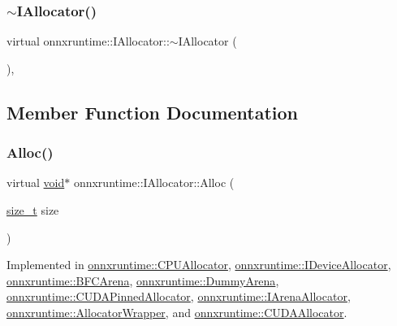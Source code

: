 \subsubsection{\texorpdfstring{$\sim$\+I\+Allocator()}{~IAllocator()}}
{\footnotesize\ttfamily virtual onnxruntime\+::\+I\+Allocator\+::$\sim$\+I\+Allocator (\begin{DoxyParamCaption}{ }\end{DoxyParamCaption})\hspace{0.3cm}{\ttfamily [virtual]}, {\ttfamily [default]}}



\subsection{Member Function Documentation}
\mbox{\label{classonnxruntime_1_1IAllocator_a765590df724d3e7805c1dddbfe290b11}} 
\subsubsection{\texorpdfstring{Alloc()}{Alloc()}}
{\footnotesize\ttfamily virtual \mbox{\hyperlink{mlasi_8h_a88f941d423cb2a819b70a1358982b1a6}{void}}$\ast$ onnxruntime\+::\+I\+Allocator\+::\+Alloc (\begin{DoxyParamCaption}\item[{\mbox{\hyperlink{mlasi_8h_a503efbc1c6e50825320ad909366b78ab}{size\+\_\+t}}}]{size }\end{DoxyParamCaption})\hspace{0.3cm}{\ttfamily [pure virtual]}}



Implemented in \mbox{\hyperlink{classonnxruntime_1_1CPUAllocator_a682cac57e48712c5c09506c21d92905c}{onnxruntime\+::\+C\+P\+U\+Allocator}}, \mbox{\hyperlink{classonnxruntime_1_1IDeviceAllocator_aa703af32705cabad8c9f69e60efcfb6b}{onnxruntime\+::\+I\+Device\+Allocator}}, \mbox{\hyperlink{classonnxruntime_1_1BFCArena_a1e4bda05da04e05e5a9a58c3839e2a14}{onnxruntime\+::\+B\+F\+C\+Arena}}, \mbox{\hyperlink{classonnxruntime_1_1DummyArena_a44c2bb22792ce63e5d7bfa4b3e03d968}{onnxruntime\+::\+Dummy\+Arena}}, \mbox{\hyperlink{classonnxruntime_1_1CUDAPinnedAllocator_a22d04b010dc7782d37689ae50bab2535}{onnxruntime\+::\+C\+U\+D\+A\+Pinned\+Allocator}}, \mbox{\hyperlink{classonnxruntime_1_1IArenaAllocator_a879507b0ec3b184d9bb60281191b8cd6}{onnxruntime\+::\+I\+Arena\+Allocator}}, \mbox{\hyperlink{classonnxruntime_1_1AllocatorWrapper_aee649143cd3134b3b838fd81cfe2f457}{onnxruntime\+::\+Allocator\+Wrapper}}, and \mbox{\hyperlink{classonnxruntime_1_1CUDAAllocator_a21b66ae0d3ddcfdfd6c2bcafcffcdfda}{onnxruntime\+::\+C\+U\+D\+A\+Allocator}}.

